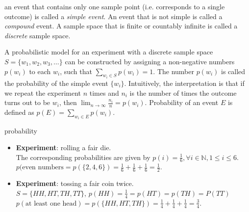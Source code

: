 \begin{definition}
    an event that contains only one sample point (i.e. corresponds to a single
outcome) is called a \emph{simple event}. An event that is not simple is called
a \emph{compound} event. A sample space that is finite or countably infinite is
called a \emph{discrete} sample space.
\end{definition}

A probabilistic model for an experiment with a discrete sample space $S =
\lbrace w_1, w_2, w_3, \dots \rbrace$ can be constructed by assigning a
non-negative numbers $p(w_i)$ to each $w_i$, such that $\sum_{w_i
\in S} p(w_i) = 1$. The number $p(w_i)$ is called the probability of the simple
event $\lbrace w_i \rbrace$. Intuitively, the interpretation is that if we
repeat the experiment $n$ times and $n_i$ is the number of times the outcome
turns out to be $w_i$, then $\lim_{n \rightarrow \infty} \frac{n_i}{n} =
p(w_i)$. Probability of an event $E$ is defined as $p(E) = \sum_{w_i
\in E} p(w_i)$.

\begin{example}
probability
\begin{itemize}[noitemsep,topsep=0pt]
    \item
    \textbf{Experiment}: rolling a fair die.                                 \\
    The corresponding probabilities are given by $p(i) = \frac{1}{6}, \forall i
    \in \mathbb{N}, 1 \leq i \leq 6$.                                        \\
    $p(\text{even numbers} = p(\lbrace 2, 4, 6 \rbrace) = \frac{1}{6} +
    \frac{1}{6} + \frac{1}{6} = \frac{1}{2}$.
    \item
    \textbf{Experiment}: tossing a fair coin twice.                          \\
    $S = \lbrace HH, HT, TH, TT \rbrace$, $p(HH) = \frac{1}{4} = p(HT) = p(TH)
    = P(TT)$                                                                 \\
    $p(\text{at least one head}) = p(\lbrace HH, HT, TH \rbrace) = \frac{1}{4}
    + \frac{1}{4} + \frac{1}{4} = \frac{3}{4}$.
\end{itemize}
\end{example}

